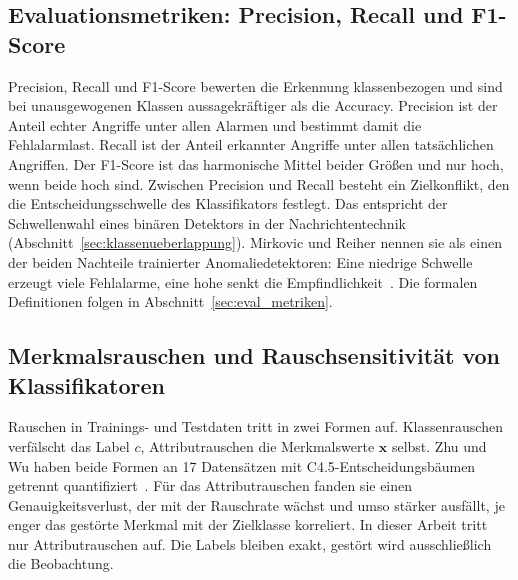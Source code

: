 \subsection{Evaluationsmetriken: Precision, Recall und F1-Score}
Precision, Recall und F1-Score bewerten die Erkennung klassenbezogen und sind bei unausgewogenen Klassen aussagekräftiger als die Accuracy. Precision ist der Anteil echter Angriffe unter allen Alarmen und bestimmt damit die Fehlalarmlast. Recall ist der Anteil erkannter Angriffe unter allen tatsächlichen Angriffen. Der F1-Score ist das harmonische Mittel beider Größen und nur hoch, wenn beide hoch sind. Zwischen Precision und Recall besteht ein Zielkonflikt, den die Entscheidungsschwelle des Klassifikators festlegt. Das entspricht der Schwellenwahl eines binären Detektors in der Nachrichtentechnik (Abschnitt~\ref{sec:klassenueberlappung}). Mirkovic und Reiher nennen sie als einen der beiden Nachteile trainierter Anomaliedetektoren: Eine niedrige Schwelle erzeugt viele Fehlalarme, eine hohe senkt die Empfindlichkeit~\autocite{mirkovicTaxonomyDDoSAttack2004}. Die formalen Definitionen folgen in Abschnitt~\ref{sec:eval_metriken}.

\subsection{Merkmalsrauschen und Rauschsensitivität von Klassifikatoren}
\label{sec:merkmalsrauschen}
Rauschen in Trainings- und Testdaten tritt in zwei Formen auf. Klassenrauschen verfälscht das Label $c$, Attributrauschen die Merkmalswerte $\mathbf{x}$ selbst. Zhu und Wu haben beide Formen an 17 Datensätzen mit C4.5-Entscheidungsbäumen getrennt quantifiziert~\autocite{zhuClassNoiseVs2004}. Für das Attributrauschen fanden sie einen Genauigkeitsverlust, der mit der Rauschrate wächst und umso stärker ausfällt, je enger das gestörte Merkmal mit der Zielklasse korreliert. In dieser Arbeit tritt nur Attributrauschen auf. Die Labels bleiben exakt, gestört wird ausschließlich die Beobachtung.

